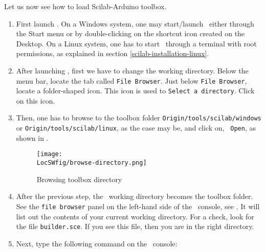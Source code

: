 Let us now see how to load Scilab-Arduino toolbox. 
\begin{enumerate}
      \item First launch \scilab. On a Windows system, one may start/launch
            \scilab\ either through the Start menu or by double-clicking on the
            shortcut icon created on the Desktop. On a Linux system, one has to
            start \scilab\ through a terminal with root permissions, as
            explained in section \ref{scilab-installation-linux}.
      \item After launching \scilab, first we have to change the working
            directory. Below the menu bar, locate the tab called {\tt File Browser}. 
            Just below {\tt File Browser}, locate a folder-shaped icon. 
            This icon is used to {\tt Select a directory}. Click on this icon.   
      \item Then, one has to browse to the toolbox folder
                  {\tt Origin/tools/scilab/windows} or {\tt Origin/tools/scilab/linux}, as the case
            may be, and click on, {\tt
                        Open}, as shown in .
            \begin{figure}
                  \centering
                  \texttt{[image: \\LocSWfig/browse-directory.png]}
                  \caption{Browsing toolbox directory}
                  \label{scilab-browse}
            \end{figure}
      \item After the previous step, the \scilab\ working directory becomes
            the toolbox folder.  See the {\tt file browser} panel on the
            left-hand side of the \scilab\ console, see .  It
            will list out the contents of your current working directory. For a
            check, look for the file {\tt builder.sce}.  If you see this file,
            then you are in the right directory.
      \item Next, type the following command on the \scilab\ console: {\tt
}
\end{enumerate}
